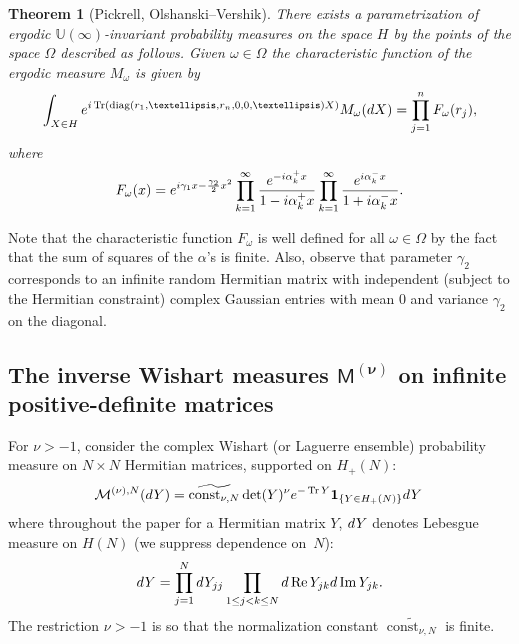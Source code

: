 \documentclass[11pt]{article}
\numberwithin{equation}{section}
\newtheorem{Theorem}{Theorem}[section]
\begin{document}
\begin{Theorem}[Pickrell, Olshanski--Vershik] There exists a parametrization of ergodic $\mathbb{U}(\infty)$-invariant probability measures on the space $H$ by the points of the space $\Omega$ described as follows. Given $\omega \in \Omega$ the characteristic function of the ergodic measure $M_{\omega}$ is given by
\begin{gather*}
\int_{X \in H}^{}{\rm e}^{{\rm i}\operatorname{Tr}(\operatorname{diag}(r_1,\dots,r_n,0,0,\dots)X)}M_{\omega}({\rm d}X)=\prod_{j=1}^{n}F_{\omega}(r_j),
\end{gather*}
where
\begin{gather*}
F_{\omega}(x)={\rm e}^{{\rm i}\gamma_1x-\frac{\gamma_2}{2}x^ 2}\prod_{k=1}^{\infty}\frac{{\rm e}^{-{\rm i}\alpha_k^+x}}{1-{\rm i}\alpha_k^+x}\prod_{k=1}^{\infty}\frac{{\rm e}^{{\rm i}\alpha_k^-x}}{1+{\rm i}\alpha_k^-x} .
\end{gather*}
\end{Theorem}
Note that the characteristic function $F_{\omega}$ is well defined for all $\omega \in \Omega$ by the fact that the sum of squares of the $\alpha$'s is finite. Also, observe that parameter $\gamma_2$ corresponds to an infinite random Hermitian matrix with independent (subject to the Hermitian constraint) complex Gaussian entries with mean 0 and variance $\gamma_2$ on the diagonal.

\subsection[The inverse Wishart measures $\mathsf{M}^{(\nu)}$ on infinite positive-definite matrices]{The inverse Wishart measures $\boldsymbol{\mathsf{M}^{(\nu)}}$ on infinite positive-definite matrices}\label{section1.3}

For $\nu>-1$, consider the complex Wishart (or Laguerre ensemble) probability measure on $N \times N$ Hermitian matrices, supported on $H_+(N)$:
\begin{gather*}
\mathcal{M}^{(\nu),N}({\rm d}Y)=\widetilde{\operatorname{const}_{\nu, N}}\det(Y)^{\nu} {\rm e}^{-\operatorname{Tr}Y}\mathbf{1}_{\{Y \in H_+(N)\}}{\rm d}Y\,
\end{gather*}
where throughout the paper for a Hermitian matrix $Y$, ${\rm d}Y$ denotes Lebesgue measure on $H(N)$ (we suppress dependence on~$N$):
\begin{gather*}
{\rm d}Y=\prod_{j=1}^{N}{\rm d}Y_{jj} \prod_{1 \le j <k \le N}^{}{\rm d} \operatorname{Re} Y_{jk}{\rm d} \operatorname{Im} Y_{jk}.
\end{gather*}
The restriction $\nu>-1$ is so that the normalization constant $\widetilde{\operatorname{const}_{\nu, N}}$ is finite.
\end{document}
